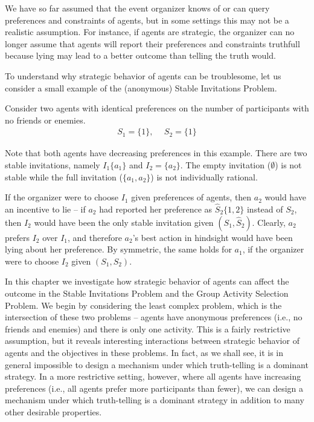 \label{GT:chapter}


We have so far assumed that the event organizer knows of or can query preferences and constraints of agents, but in some settings this may not be a realistic assumption. For instance, if agents are strategic, the organizer can no longer assume that agents will report their preferences and constraints truthfull because lying may lead to a better outcome than telling the truth would.

To understand why strategic behavior of agents can be troublesome, let us consider a small example of the (anonymous) Stable Invitations Problem.

\begin{example} \label{GT:eg:strategicAgents}
		Consider two agents with identical preferences on the number of participants with no friends or enemies. 
	\begin{equation*}
		\begin{aligned}
				S_1 = \{1\}, ~~& S_2 = \{1\}
		\end{aligned}
	\end{equation*}

Note that both agents have decreasing preferences in this example. 
There are two stable invitations, namely $I_1 \{a_1\}$ and $I_2 = \{a_2\}$. 
The empty invitation ($\emptyset$) is not stable while the full invitation ($\{a_1,a_2\}$) is not individually rational. 

If the organizer were to choose $I_1$ given preferences of agents, then $a_2$ would have an incentive to lie -- if $a_2$ had reported her preference as $\hat{S}_2 \{1, 2\}$ instead of $S_2$, then $I_2$ would have been the only stable invitation given $(S_1, \hat{S}_2)$. Clearly, $a_2$ prefers $I_2$ over $I_1$, and therefore $a_2$'s best action in hindsight would have been lying about her preference. By symmetric, the same holds for $a_1$, if the organizer were to choose $I_2$ given $(S_1, S_2)$.
\end{example}

In this chapter we investigate how strategic behavior of agents can affect the outcome in the Stable Invitations Problem and the Group Activity Selection Problem. We begin by considering the least complex problem, which is the intersection of these two problems -- agents have anonymous preferences (i.e., no friends and enemies) and there is only one activity. This is a fairly restrictive assumption, but it reveals interesting interactions between strategic behavior of agents and the objectives in these problems. In fact, as we shall see, it is in general impossible to design a mechanism under which truth-telling is a dominant strategy. In a more restrictive setting, however, where all agents have increasing preferences (i.e., all agents prefer more participants than fewer), we can design a mechanism under which truth-telling is a dominant strategy in addition to many other desirable properties. 



